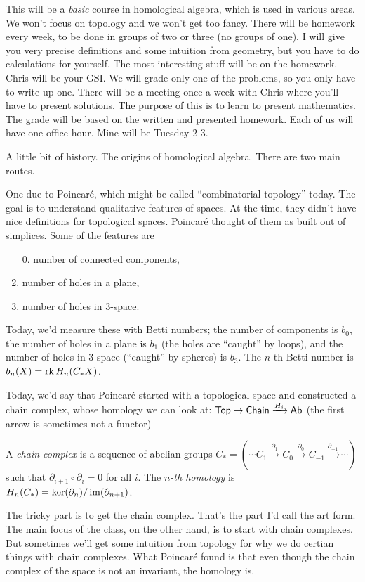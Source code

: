 
This will be a \emph{basic} course in homological algebra, which is used in various areas. We won't focus on topology and we won't get too fancy. There will be homework every week, to be done in groups of two or three (no groups of one). I will give you very precise definitions and some intuition from geometry, but you have to do calculations for yourself. The most interesting stuff will be on the homework. Chris will be your GSI. We will grade only one of the problems, so you only have to write up one. There will be a meeting once a week with Chris where you'll have to present solutions. The purpose of this is to learn to present mathematics. The grade will be based on the written and presented homework. Each of us will have one office hour. Mine will be Tuesday 2-3.

A little bit of history. The origins of homological algebra. There are two main routes. 

One due to Poincar\'e, which might be called ``combinatorial topology'' today. The goal is to understand qualitative features of spaces. At the time, they didn't have nice definitions for topological spaces. Poincar\'e thought of them as built out of simplices. Some of the features are
\begin{enumerate}
 \item[0.] number of connected components,
 \item number of holes in a plane,
 \item number of holes in 3-space.
\end{enumerate}

Today, we'd measure these with Betti numbers; the number of components is $b_0$, the number of holes in a plane is $b_1$ (the holes are ``caught'' by loops), and the number of holes in 3-space (``caught'' by spheres) is $b_3$. The $n$-th Betti number is $b_n(X)=\operatorname{rk} H_n(C_* X)$.

Today, we'd say that Poincar\'e started with a topological space and constructed a chain complex, whose homology we can look at: $\text{\sf Top}\to \text{\sf Chain}\xrightarrow{H_i}\text{\sf Ab}$ (the first arrow is sometimes not a functor)
\begin{definition}
 A \emph{chain complex} is a sequence of abelian groups $C_*=(\cdots C_{1}\xrightarrow{\partial_{1}} C_0\xrightarrow{\partial_0} C_{-1}\xrightarrow{\partial_{-1}}\cdots)$ such that $\partial_{i+1}\circ \partial_i=0$ for all $i$. The \emph{$n$-th homology} is $H_n(C_*)=\ker(\partial_n)/\operatorname{im}(\partial_{n+1})$.
\end{definition}
The tricky part is to get the chain complex. That's the part I'd call the art form. The main focus of the class, on the other hand, is to start with chain complexes. But sometimes we'll get some intuition from topology for why we do certian things with chain complexes. What Poincar\'e found is that even though the chain complex of the space is not an invariant, the homology is.

